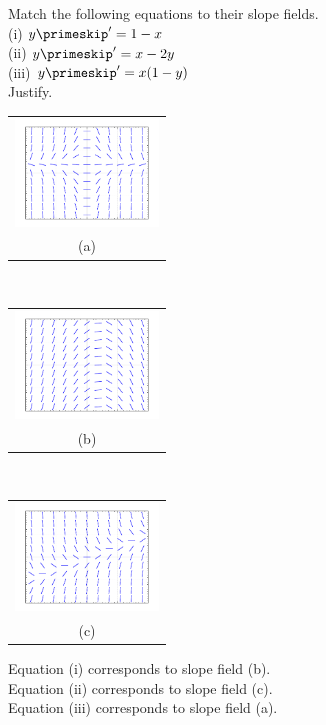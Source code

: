 {Match the following equations to their slope fields.\\
(i) $y\primeskip'=1-x$\\
(ii) $y\primeskip'=x-2y$\\
(iii) $y\primeskip' = x(1-y)$\\
Justify.

\medskip

\begin{tabular}{c}
\includegraphics[width=1.5in]{figures/yprimex1minusyslope}\\
(a)
\end{tabular}\\
\begin{tabular}{c}
\includegraphics[width=1.5in]{figures/yprime1minusxslope}\\
(b)
\end{tabular}\\
\begin{tabular}{c}
\includegraphics[width=1.5in]{figures/yprimexminus2yslope}\\
(c)
\end{tabular}
}
{Equation (i) corresponds to slope field (b).\\
Equation (ii) corresponds to slope field (c).\\
Equation (iii) corresponds to slope field (a).}